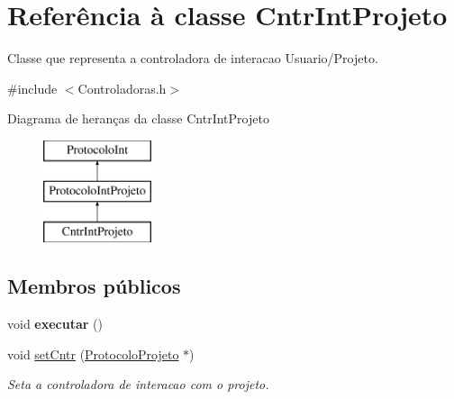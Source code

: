 \hypertarget{class_cntr_int_projeto}{
\section{\-Referência à classe \-Cntr\-Int\-Projeto}
\label{class_cntr_int_projeto}
}


\-Classe que representa a controladora de interacao \-Usuario/\-Projeto.  




{\ttfamily \#include $<$\-Controladoras.\-h$>$}

\-Diagrama de heranças da classe \-Cntr\-Int\-Projeto\begin{figure}[H]
\begin{center}
\leavevmode
\includegraphics[height=3.000000cm]{class_cntr_int_projeto}
\end{center}
\end{figure}
\subsection*{\-Membros públicos}
\begin{DoxyCompactItemize}
\item 
\hypertarget{class_cntr_int_projeto_ab6de5c18ab98d4bcb3cb5413a7f5cf00}{
void {\bfseries executar} ()}
\label{class_cntr_int_projeto_ab6de5c18ab98d4bcb3cb5413a7f5cf00}

\item 
void \hyperlink{class_cntr_int_projeto_a21952091898e3d965af084ecbec78301}{set\-Cntr} (\hyperlink{class_protocolo_projeto}{\-Protocolo\-Projeto} $\ast$)
\begin{DoxyCompactList}\small\item\em \-Seta a controladora de interacao com o projeto. \end{DoxyCompactList}\end{DoxyCompactItemize}
